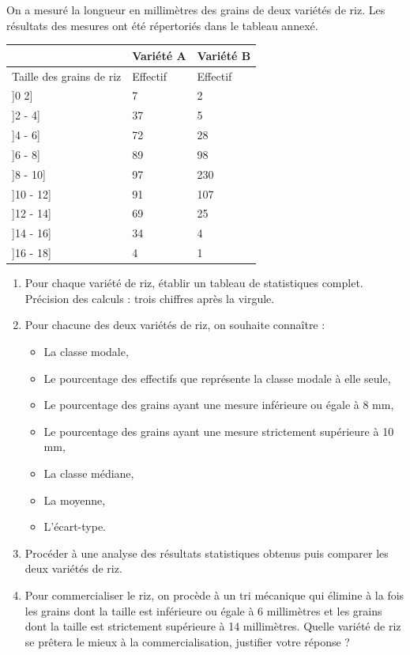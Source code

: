 \begin{exercice}
On a mesuré la longueur en millimètres des grains de deux variétés de riz. Les résultats des mesures ont été répertoriés dans le tableau annexé.

\begin{tabular}{|l|l|l|}
\hline
                         & Variété A & Variété B \\ \hline
Taille des grains de riz & Effectif  & Effectif  \\ \hline
{]}0  2{]}               & 7         & 2         \\ \hline
{]}2 - 4{]}              & 37        & 5         \\ \hline
{]}4 - 6{]}              & 72        & 28        \\ \hline
{]}6 - 8{]}              & 89        & 98        \\ \hline
{]}8 - 10{]}             & 97        & 230       \\ \hline
{]}10 - 12{]}            & 91        & 107       \\ \hline
{]}12 - 14{]}            & 69        & 25        \\ \hline
{]}14 - 16{]}            & 34        & 4         \\ \hline
{]}16 - 18{]}            & 4         & 1         \\ \hline
\end{tabular}

\begin{enumerate}
\item Pour chaque variété de riz, établir un tableau de statistiques complet. 
	Précision des calculs : trois chiffres après la virgule.
\item Pour chacune des deux variétés de riz, on souhaite connaître :
	\begin{itemize}
	\item La classe modale,
	\item Le pourcentage des effectifs que représente la classe modale à elle seule,
	\item Le pourcentage des grains ayant une mesure inférieure ou égale à 8 mm,
	\item Le pourcentage des grains ayant une mesure strictement supérieure à 10 mm,
	\item La classe médiane,
	\item La moyenne,
	\item L’écart-type.
	\end{itemize}
\item Procéder à une analyse des résultats statistiques obtenus puis comparer les deux variétés de riz.
\item Pour commercialiser le riz, on procède à un tri mécanique qui élimine à la fois les grains dont la taille est inférieure ou égale à 6 millimètres et les grains dont la taille est strictement supérieure à 14 millimètres. Quelle variété de riz se prêtera le mieux à la commercialisation, justifier votre réponse ? 
\end{enumerate}
\end{exercice}


